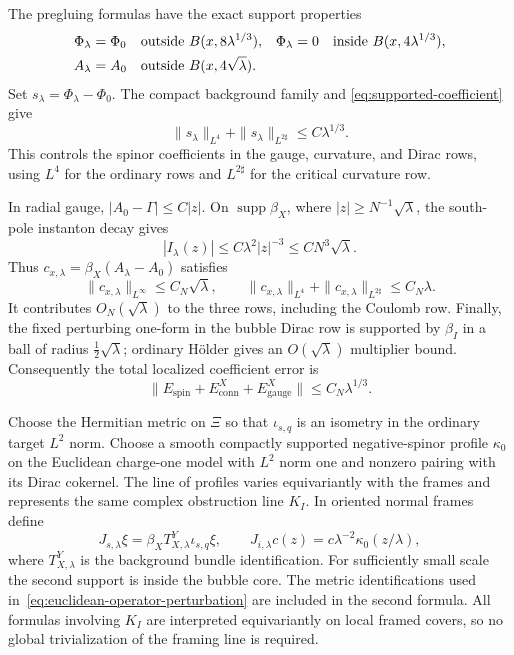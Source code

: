 \documentclass[11pt]{amsart}
\theoremstyle{definition}
\theoremstyle{remark}
\theoremstyle{plain}
\begin{document}
The pregluing formulas have the exact support properties
\begin{align}\label{eq:pregluing-supports}
 \Phi_\lambda&=\Phi_0
 &&\text{outside }B(x,8\lambda^{1/3}),
 &\Phi_\lambda&=0
 &&\text{inside }B(x,4\lambda^{1/3}),\notag\\
 A_\lambda&=A_0
 &&\text{outside }B(x,4\sqrt\lambda).
\end{align}
Set $s_\lambda=\Phi_\lambda-\Phi_0$.  The compact background family and
\eqref{eq:supported-coefficient} give
\begin{equation}\label{eq:spinor-coefficient}
 \|s_\lambda\|_{L^4}+\|s_\lambda\|_{L^{2\sharp}}
 \leq C\lambda^{1/3}.
\end{equation}
This controls the spinor coefficients in the gauge, curvature, and Dirac
rows, using $L^4$ for the ordinary rows and $L^{2\sharp}$ for the critical
curvature row.

In radial gauge, $|A_0-\Gamma|\leq C|z|$.  On
$\operatorname{supp}\beta_X$, where $|z|\geq N^{-1}\sqrt\lambda$, the
south-pole instanton decay gives
\[
 |I_\lambda(z)|\leq C\lambda^2|z|^{-3}
 \leq C N^3\sqrt\lambda.
\]
Thus $c_{x,\lambda}=\beta_X(A_\lambda-A_0)$ satisfies
\begin{equation}\label{eq:background-connection-coefficient}
 \|c_{x,\lambda}\|_{L^\infty}\leq C_N\sqrt\lambda,
 \qquad
 \|c_{x,\lambda}\|_{L^4}
 +\|c_{x,\lambda}\|_{L^{2\sharp}}\leq C_N\lambda.
\end{equation}
It contributes $O_N(\sqrt\lambda)$ to the three rows, including the Coulomb
row.  Finally, the fixed perturbing one-form in the bubble Dirac row is
supported by $\beta_I$ in a ball of radius $\tfrac12\sqrt\lambda$; ordinary
H\"older gives an $O(\sqrt\lambda)$ multiplier bound.  Consequently the
total localized coefficient error is
\begin{equation}\label{eq:coefficient-error}
 \|E_{\mathrm{spin}}+E^X_{\mathrm{conn}}+E^X_{\mathrm{gauge}}\|
 \leq C_N\lambda^{1/3}.
\end{equation}

Choose the Hermitian metric on $\Xi$ so that $\iota_{s,q}$ is an
isometry in the ordinary target $L^2$ norm.  Choose a smooth compactly
supported negative-spinor profile $\kappa_0$ on the Euclidean charge-one
model with $L^2$ norm one and nonzero pairing with its Dirac cokernel.
The line of profiles varies equivariantly with the frames and represents
the same complex obstruction line $K_I$.  In oriented normal frames define
\begin{equation}\label{eq:matched-embeddings}
 J_{s,\lambda}\xi=\beta_XT^Y_{X,\lambda}\iota_{s,q}\xi,
 \qquad
 J_{i,\lambda}c(z)=c\lambda^{-2}\kappa_0(z/\lambda),
\end{equation}
where $T^Y_{X,\lambda}$ is the background bundle identification.  For
sufficiently small scale the second support is inside the bubble core.
The metric identifications used in~\eqref{eq:euclidean-operator-perturbation}
are included in the second formula.
All formulas involving $K_I$ are interpreted equivariantly on local framed
covers, so no global trivialization of the framing line is required.
\end{document}
